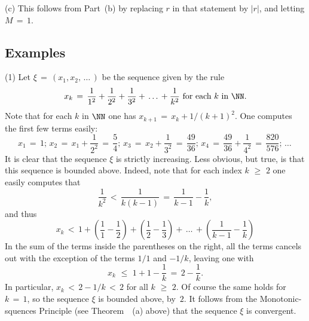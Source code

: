         (c) This follows from Part~(b) by replacing $r$ in that statement by $|r|$, and letting $M \,=\, 1$.


\V

            \subsection{\small{\bf Examples}} 
            \label{ExampC20.20}

\hspace*{\parindent}(1) Let ${\xi} \,=\, (x_{1},x_{2},\,{\ldots}\,)$ be the sequence given by the rule
        \begin{displaymath}
        x_{k} \,=\, \frac{1}{1^{2}} + \frac{1}{2^{2}} + \frac{1}{3^{2}} + \,{\ldots}\, + \frac{1}{k^{2}} \mbox{ for each $k$ in ${\NN}$}.
        \end{displaymath}
    Note that for each $k$ in ${\NN}$ one has $x_{k+1} \,=\, x_{k} + 1/(k+1)^{2}$. One computes the first few terms easily:
        \begin{displaymath}
        x_{1} \,=\, 1;\, x_{2} \,=\, x_{1} + \frac{1}{2^{2}} \,=\, \frac{5}{4};\, x_{3} \,=\, x_{2} + \frac{1}{3^{2}} \,=\, \frac{49}{36};\,
        x_{4} \,=\, \frac{49}{36} + \frac{1}{4^{2}} \,=\, \frac{820}{576}; \,{\ldots}\,
        \end{displaymath}
    It is clear that the sequence ${\xi}$ is strictly increasing. Less obvious, but true, is that this sequence is bounded above.
    Indeed, note that for each index $k\,\,{\geq}\,\,2$ one easily computes that
        \begin{displaymath}
        \frac{1}{k^{2}}\,<\,\frac{1}{k(k-1)} \,=\, \frac{1}{k-1} - \frac{1}{k},
        \end{displaymath}
    and thus
        \begin{displaymath}
        x_{k}\,<\, 1+\left(\frac{1}{1} - \frac{1}{2}\right) + \left(\frac{1}{2} - \frac{1}{3}\right)
    +\,{\ldots}\, + \left(\frac{1}{k-1} - \frac{1}{k}\right)
        \end{displaymath}
    In the sum of the terms inside the parentheses on the right, all the terms cancels out with the exception of the terms $1/1$ and $-1/k$, leaving one with
        \begin{displaymath}
        x_{k}\,\,{\leq}\,\,1+1-\frac{1}{k} \,=\, 2-\frac{1}{k}.
        \end{displaymath}
    In particular, $x_{k}\,<\,2-1/k\,<\,2$ for all $k\,\,{\geq}\,\,2$. Of course the same holds for $k \,=\, 1$, so the sequence ${\xi}$ is bounded above, by~$2$.
    It follows from the Monotonic-squences Principle (see Theorem~~(a) above) that the sequence ${\xi}$ is convergent.

